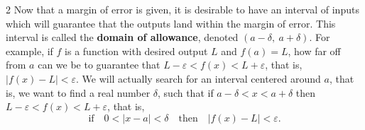 \documentclass{book}
\begin{document}
\begin{multicols}{2}
Now that a margin of error is given, it is desirable to have an interval of inputs which will guarantee that the outputs land within the margin of error. This interval is called the \textbf{domain of allowance}, denoted $(a-\delta,\ a+\delta)$. For example, if $f$ is a function with desired output $L$ and $f(a) = L$, how far off from $a$ can we be to guarantee that $L-\varepsilon < f(x) < L+ \varepsilon$, that is, $|f(x) - L | < \varepsilon$. We will actually search for an interval centered around $a$, that is, we want to find a real number $\delta$, such that if $a- \delta < x <  a+\delta$ then $L-\varepsilon < f(x) <  L+\varepsilon$, that is, 
\[\text{if}\quad 0<|x - a| < \delta \quad\text{then}\quad |f(x) - L | < \varepsilon.\]\vfill \mbox{}\columnbreak


\end{multicols}
\end{document}
